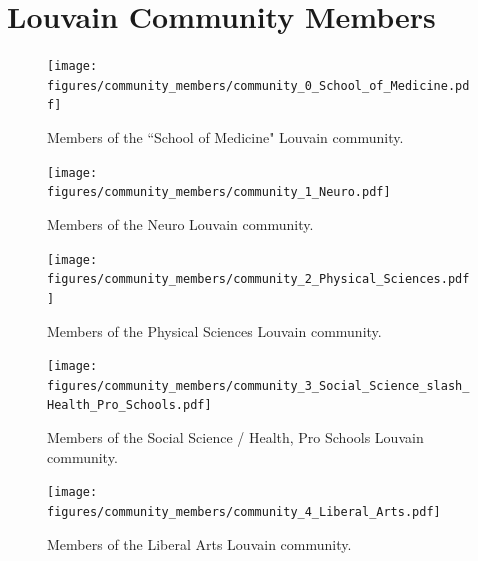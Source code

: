 \documentclass[notitlepage,aps,prd,nofootinbib]{revtex4-1}
\newcommand{\figures}{../outputs/plots}
\newcommand{\includedir}{../latex_files}
\begin{document}




\newpage %

\appendix*
\section{Louvain Community Members}

\begin{figure}[!htb]\centering
  \texttt{[image: \\figures/community\_members/community\_0\_School\_of\_Medicine.pdf]}
  \caption{Members of the ``School of Medicine" Louvain community.}
\end{figure}

\begin{figure}[!htb]\centering
  \texttt{[image: \\figures/community\_members/community\_1\_Neuro.pdf]}
  \caption{Members of the Neuro Louvain community.}
\end{figure}

\begin{figure}[!htb]\centering
  \texttt{[image: \\figures/community\_members/community\_2\_Physical\_Sciences.pdf]}
  \caption{Members of the Physical Sciences Louvain community.}
  \label{fig:f_community_physical_sciences}
\end{figure}

\begin{figure}[!htb]\centering
  \texttt{[image: \\figures/community\_members/community\_3\_Social\_Science\_slash\_Health\_Pro\_Schools.pdf]}
  \caption{Members of the Social Science / Health, Pro Schools Louvain community.}
\end{figure}

\begin{figure}[!htb]\centering
  \texttt{[image: \\figures/community\_members/community\_4\_Liberal\_Arts.pdf]}
  \caption{Members of the Liberal Arts Louvain community.}
\end{figure}
\end{document}
